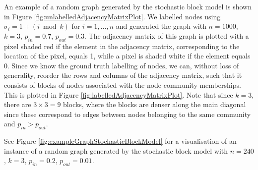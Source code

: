 \documentclass[12pt]{article}
\numberwithin{equation}{section}
\begin{document}
An example of a random graph generated by the stochastic block model is shown in Figure \ref{fig:unlabelledAdjacencyMatrixPlot}. We labelled nodes using $\sigma_{i} = 1 + (i \bmod{k})$ for $i = 1,\dots,n$ and generated the graph with $n = 1000$, $k = 3$, $p_{in} = 0.7$, $p_{out} = 0.3$. The adjacency matrix of this graph is plotted with a pixel shaded red if the element in the adjacency matrix, corresponding to the location of the pixel, equals 1, while a pixel is shaded white if the element equals 0. Since we know the ground truth labelling of nodes, we can, without loss of generality, reorder the rows and columns of the adjacency matrix, such that it consists of blocks of nodes associated with the node community memberships. This is plotted in Figure \ref{fig:labelledAdjacencyMatrixPlot}. Note that since $k = 3$, there are $3 \times 3 = 9$ blocks, where the blocks are denser along the main diagonal since these correspond to edges between nodes belonging to the same community and $p_{in} > p_{out}$.


See Figure \ref{fig:exampleGraphStochasticBlockModel} for a visualisation of an instance of a random graph generated by the stochastic block model with $n = 240$, $k = 3$, $p_{in} = 0.2$, $p_{out} = 0.01$.

\end{document}
